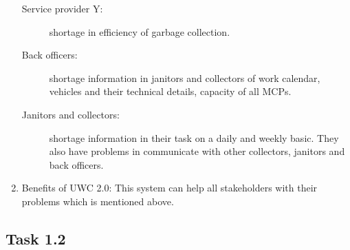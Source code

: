 \documentclass[a4paper]{article}
\begin{document}
\begin{enumerate}
\begin{description}
            \item[Service provider Y:] shortage in efficiency of garbage collection.
            \item[Back officers:] shortage information in janitors and collectors of work calendar, vehicles and their technical details, capacity of all MCPs.
            \item[Janitors and collectors:] shortage information in their task on a daily and weekly basic. They also have problems in communicate with other collectors, janitors and back officers.
        \end{description}
    \item Benefits of UWC 2.0: This system can help all stakeholders with their problems which is mentioned above.
\end{enumerate}    
\subsection{Task 1.2}
\end{document}
